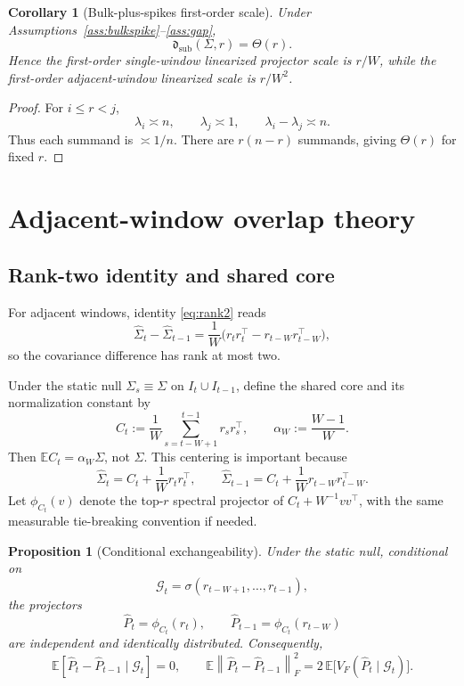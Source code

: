 \documentclass[11pt]{article}
\theoremstyle{tightplain}
\newtheorem{proposition}[theorem]{Proposition}
\newtheorem{corollary}[theorem]{Corollary}
\theoremstyle{tightdef}
\newcommand{\E}{\mathbb E}
\newcommand{\norm}[1]{\left\lVert #1 \right\rVert}
\newcommand{\dsub}{\mathfrak d_{\mathrm{sub}}}
\begin{document}
\begin{corollary}[Bulk-plus-spikes first-order scale]\label{cor:firstorderscale}
Under Assumptions~\ref{ass:bulkspike}--\ref{ass:gap},
\[
\dsub(\Sigma,r)=\Theta(r).
\]
Hence the first-order single-window linearized projector scale is $r/W$, while
the first-order adjacent-window linearized scale is $r/W^2$.
\end{corollary}

\begin{proof}
For $i\le r<j$,
\[
\lambda_i\asymp n,
\qquad
\lambda_j\asymp 1,
\qquad
\lambda_i-\lambda_j\asymp n.
\]
Thus each summand is $\asymp 1/n$. There are $r(n-r)$ summands, giving
$\Theta(r)$ for fixed $r$.
\end{proof}

\section{Adjacent-window overlap theory}

\subsection{Rank-two identity and shared core}

For adjacent windows, identity \eqref{eq:rank2} reads
\[
\widehat\Sigma_t-\widehat\Sigma_{t-1}
=\frac1W\bigl(r_t r_t^\top-r_{t-W}r_{t-W}^\top\bigr),
\]
so the covariance difference has rank at most two.

Under the static null $\Sigma_s\equiv\Sigma$ on $I_t\cup I_{t-1}$, define the
shared core and its normalization constant by
\[
C_t:=\frac1W\sum_{s=t-W+1}^{t-1}r_s r_s^\top,
\qquad
\alpha_W:=\frac{W-1}{W}.
\]
Then $\E C_t=\alpha_W\Sigma$, not $\Sigma$. This centering is important because
\[
\widehat\Sigma_t=C_t+\frac1W r_t r_t^\top,
\qquad
\widehat\Sigma_{t-1}=C_t+\frac1W r_{t-W}r_{t-W}^\top.
\]
Let $\phi_{C_t}(v)$ denote the top-$r$ spectral projector of $C_t+W^{-1}vv^\top$,
with the same measurable tie-breaking convention if needed.

\begin{proposition}[Conditional exchangeability]\label{prop:exchangeability}
Under the static null, conditional on
\[
\mathcal G_t=\sigma(r_{t-W+1},\dots,r_{t-1}),
\]
the projectors
\[
\widehat P_t=\phi_{C_t}(r_t),
\qquad
\widehat P_{t-1}=\phi_{C_t}(r_{t-W})
\]
are independent and identically distributed. Consequently,
\[
\E[\widehat P_t-\widehat P_{t-1}\mid\mathcal G_t]=0,
\qquad
\E\norm{\widehat P_t-\widehat P_{t-1}}_F^2
=2\,\E\bigl[V_F(\widehat P_t\mid\mathcal G_t)\bigr].
\]
\end{proposition}
\end{document}
